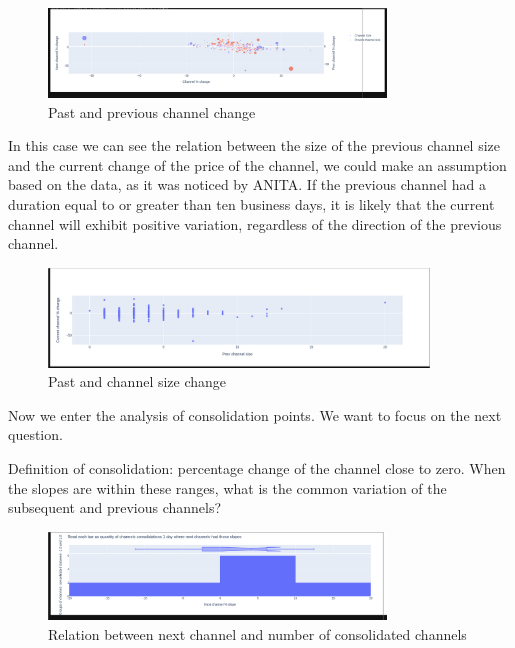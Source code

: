 \documentclass{article}
\begin{document}
\begin{figure}[h]
  \caption{Past and previous channel change}
  \begin{center}
    \includegraphics[width=0.8\textwidth]{figures/11.png}
  \end{center}
\end{figure}
\newpage
In this case we can see the relation between the size of the previous channel
size and the current change of the price of the channel, we could make an
assumption based on the data, as it was noticed by ANITA. If the previous channel had a duration equal to or greater than ten business days, it is likely that the current channel will exhibit positive variation, regardless of the direction of the previous channel.
\begin{figure}[h]
  \caption{Past and channel size change}
  \begin{center}
    \includegraphics[width=0.9\textwidth]{figures/12.png}
  \end{center}
\end{figure}

Now we enter the analysis of consolidation points. We want to focus on the next
question.

Definition of consolidation: percentage change of the channel close to zero. When the slopes are within these ranges, what is the common variation of the subsequent and previous channels?
\begin{figure}[h]
  \caption{Relation between next channel and number of consolidated channels}
  \begin{center}
    \includegraphics[width=0.8\textwidth]{figures/13.png}
  \end{center}
\end{figure}
\end{document}

